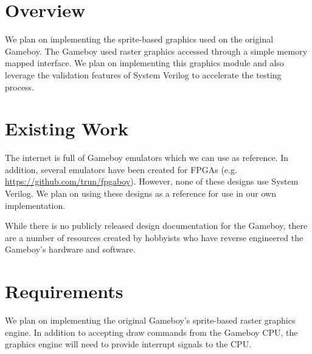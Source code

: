 \documentclass{article}
\begin{document}
\newenvironment{frcseries}{\fontfamily{frc}\selectfont}{}
\newcommand{\textfrc}[1]{{\frcseries#1}}
\newcommand{\mathfrc}[1]{\text{\textfrc{#1}}}




\section{Overview}
We plan on implementing the sprite-based graphics used on
the original Gameboy. The Gameboy used raster graphics
accessed through a simple memory mapped interface. We
plan on implementing this graphics module and also
leverage the validation features of System Verilog to 
accelerate the testing process.

\section{Existing Work}
The internet is full of Gameboy emulators which we can use
as reference. In addition, several emulators have been 
created for FPGAs (e.g.  
\url{https://github.com/trun/fpgaboy}). However, none of 
these designs use System Verilog. We plan on using these
designs as a reference for use in our own implementation.

While there is no publicly released design documentation 
for the Gameboy, there are a number of resources created 
by hobbyists who have reverse engineered the Gameboy's
hardware and software.

\section{Requirements}

We plan on implementing the original Gameboy's sprite-based raster
graphics engine. In addition to accepting draw commands from the
Gameboy CPU, the graphics engine will need to provide interrupt 
signals to the CPU. 
\end{document}
